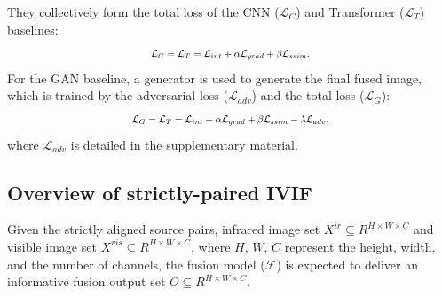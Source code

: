 They collectively form the total loss of the CNN ($\mathcal{L}_{C}$) and Transformer ($\mathcal{L}_{T}$) baselines:
\begin{equation}
\scalebox{0.8}{
$\begin{split}
   \mathcal{L}_{C} =   \mathcal{L}_{T} =  \mathcal{L}_{int}+ \alpha \mathcal{L}_{grad} + \beta \mathcal{L}_{ssim}.
\end{split}$
}
  \label{eq:cnn loss}
\end{equation}
For the GAN baseline, a generator is used to generate the final fused image, which is trained by the adversarial loss ($\mathcal{L}_{adv}$) and the total loss ($\mathcal{L}_{G}$): 
\begin{equation}
   \scalebox{0.8}{$\mathcal{L}_{G} =  \mathcal{L}_{T} =  \mathcal{L}_{int}+ \alpha \mathcal{L}_{grad} + \beta \mathcal{L}_{ssim}- \lambda\mathcal{L}_{adv},$}
\end{equation}
where $\mathcal{L}_{adv}$ is detailed in the supplementary material.

\subsection{Overview of strictly-paired IVIF}
Given the strictly aligned source pairs, infrared image set $X^{ir} \subseteq R^{H \times W \times C}$ and visible image set $X^{vis}\subseteq R^{H \times W \times C}$, where $H$, $W$, $C$ represent the height, width, and the number of channels, the fusion model ($\mathcal{F}$) is expected to deliver an informative fusion output set $O\subseteq R^{H \times W \times C}$. 


